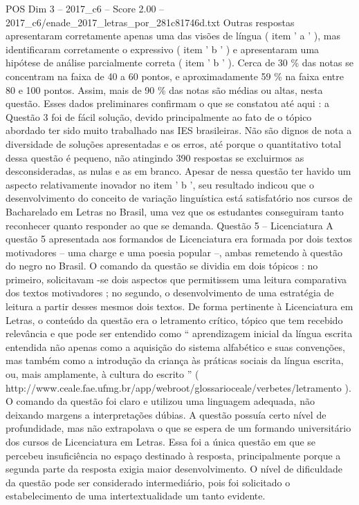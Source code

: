 \begin{textsample}{POS Dim 3 – 2017\_c6 – Score 2.00 – 2017\_c6/enade\_2017\_letras\_por\_281c81746d.txt}
Outras respostas apresentaram corretamente apenas uma das visões de língua ( item ' a ' ), mas identificaram corretamente o expressivo ( item ' b ' ) e apresentaram uma hipótese de análise parcialmente correta ( item ' b ' ).
Cerca de 30 \% das notas se concentram na faixa de 40 a 60 pontos, e aproximadamente 59 \% na faixa entre 80 e 100 pontos.
Assim, mais de 90 \% das notas são médias ou altas, nesta questão.
Esses dados preliminares confirmam o que se constatou até aqui : a Questão 3 foi de fácil solução, devido principalmente ao fato de o tópico abordado ter sido muito trabalhado nas IES brasileiras.
Não são dignos de nota a diversidade de soluções apresentadas e os erros, até porque o quantitativo total dessa questão é pequeno, não atingindo 390 respostas se excluirmos as desconsideradas, as nulas e as em branco.
Apesar de nessa questão ter havido um aspecto relativamente inovador no item ' b ', seu resultado indicou que o desenvolvimento do conceito de variação linguística está satisfatório nos cursos de Bacharelado em Letras no Brasil, uma vez que os estudantes conseguiram tanto reconhecer quanto responder ao que se demanda.
Questão 5 – Licenciatura A questão 5 apresentada aos formandos de Licenciatura era formada por dois textos motivadores – uma charge e uma poesia popular –, ambas remetendo à questão do negro no Brasil.
O comando da questão se dividia em dois tópicos : no primeiro, solicitavam -se dois aspectos que permitissem uma leitura comparativa dos textos motivadores ; no segundo, o desenvolvimento de uma estratégia de leitura a partir desses mesmos dois textos.
De forma pertinente à Licenciatura em Letras, o conteúdo da questão era o letramento crítico, tópico que tem recebido relevância e que pode ser entendido como “ aprendizagem inicial da língua escrita entendida não apenas como a aquisição do sistema alfabético e suas convenções, mas também como a introdução da criança às práticas sociais da língua escrita, ou, mais amplamente, à cultura do escrito ” ( http://www.ceale.fae.ufmg.br/app/webroot/glossarioceale/verbetes/letramento ).
O comando da questão foi claro e utilizou uma linguagem adequada, não deixando margens a interpretações dúbias.
A questão possuía certo nível de profundidade, mas não extrapolava o que se espera de um formando universitário dos cursos de Licenciatura em Letras.
Essa foi a única questão em que se percebeu insuficiência no espaço destinado à resposta, principalmente porque a segunda parte da resposta exigia maior desenvolvimento.
O nível de dificuldade da questão pode ser considerado intermediário, pois foi solicitado o estabelecimento de uma intertextualidade um tanto evidente.

\end{textsample}
